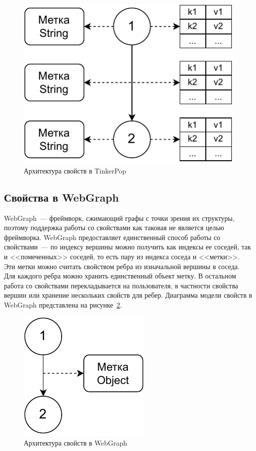 \documentclass[times,specification,annotation]{itmo-student-thesis}
\begin{document}
\begin{figure}[!h]
\caption{Архитектура свойств в TinkerPop}\label{fig2}
\centering
\includegraphics{img/tinker-props.pdf}
\end{figure}

\subsection{Свойства в WebGraph}\label{sec:webgraph-props}

WebGraph~--- фреймворк, сжимающий графы с точки зрения их структуры, поэтому поддержка работы со свойствами как таковая не является целью фреймворка. WebGraph предоставляет единственный способ работы со свойствами~--- по индексу вершины можно получить как индексы ее соседей, так и <<помеченных>> соседей, то есть пару из индекса соседа и <<метки>>.
Эти метки можно считать свойством ребра из изначальной вершины в соседа. Для каждого ребра можно хранить единственный объект метку. В остальном работа со свойствами перекладывается на пользователя, в частности свойства вершин или хранение нескольких свойств для ребер. Диаграмма модели свойств в WebGraph представлена на рисунке~\ref{fig3}.

\begin{figure}[!h]
\caption{Архитектура свойств в WebGraph}\label{fig3}
\centering
\includegraphics{img/webgraph-props.pdf}
\end{figure}
\end{document}
